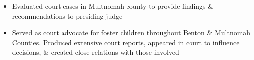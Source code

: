 \begin{itemize}
    \item {Evaluated court cases in Multnomah county to provide findings \& recommendations to presiding judge}
\end{itemize} \smallskip

\begin{itemize}
    \item {Served as court advocate for foster children throughout Benton \& Multnomah Counties. Produced extensive court reports, appeared in court to influence decisions, \& created close relations with those involved}
\end{itemize}



\smallskip